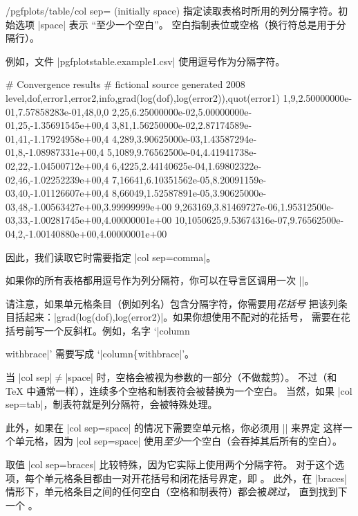 \documentclass[a4paper,doc2]{ltxdoc}
\begin{document}
\begin{key}{/pgfplots/table/col sep= (initially space)}
    指定读取表格时所用的列分隔字符。初始选项 |space| 表示 ``至少一个空白''。
    空白指制表位或空格（换行符总是用于分隔行）。

    例如，文件 |pgfplotstable.example1.csv| 使用逗号作为分隔字符。
\begin{codeexample}
# Convergence results
# fictional source generated 2008
level,dof,error1,error2,info,{grad(log(dof),log(error2))},quot(error1)
1,9,2.50000000e-01,7.57858283e-01,48,0,0
2,25,6.25000000e-02,5.00000000e-01,25,-1.35691545e+00,4
3,81,1.56250000e-02,2.87174589e-01,41,-1.17924958e+00,4
4,289,3.90625000e-03,1.43587294e-01,8,-1.08987331e+00,4
5,1089,9.76562500e-04,4.41941738e-02,22,-1.04500712e+00,4
6,4225,2.44140625e-04,1.69802322e-02,46,-1.02252239e+00,4
7,16641,6.10351562e-05,8.20091159e-03,40,-1.01126607e+00,4
8,66049,1.52587891e-05,3.90625000e-03,48,-1.00563427e+00,3.99999999e+00
9,263169,3.81469727e-06,1.95312500e-03,33,-1.00281745e+00,4.00000001e+00
10,1050625,9.53674316e-07,9.76562500e-04,2,-1.00140880e+00,4.00000001e+00
\end{codeexample}
    因此，我们读取它时需要指定 |col sep=comma|。
\begin{codeexample}[]
\end{codeexample}
    如果你的所有表格都用逗号作为列分隔符，你可以在导言区调用一次
    ||。

    请注意，如果单元格条目（例如列名）包含分隔字符，你需要用\emph{花括号}
    把该列条目括起来：|{grad(log(dof),log(error2)}|。如果你想使用不配对的花括号，
    需要在花括号前写一个反斜杠。例如，名字 `|column{withbrace|' 需要写成
    `|column\{withbrace|'。

    当 |col sep|$\neq$|space| 时，空格会被视为参数的一部分（不做裁剪）。
    不过（和 \TeX{} 中通常一样），连续多个空格和制表符会被替换为一个空白。
    当然，如果 |col sep=tab|，制表符就是列分隔符，会被特殊处理。

    此外，如果在 |col sep=space| 的情况下需要空单元格，你必须用 |{}| 来界定
    这样一个单元格，因为 |col sep=space| 使用\emph{至少}一个空白（会吞掉其后所有的空白）。

    取值 |col sep=braces| 比较特殊，因为它实际上使用两个分隔字符。
    对于这个选项，每个单元格条目都由一对开花括号和闭花括号界定，即 。
    此外，在 |braces| 情形下，单元格条目之间的任何空白（空格和制表符）都会被\emph{跳过}，
    直到找到下一个 。

}
\end{key}
\end{document}
